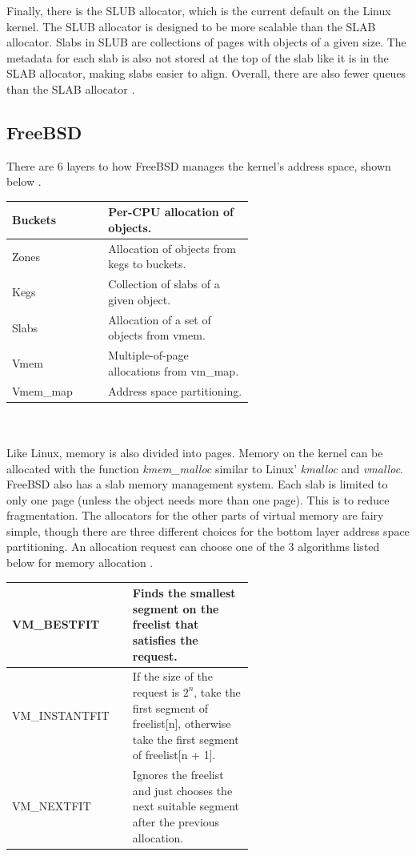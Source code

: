\documentclass[10pt,draftclsnofoot,onecolumn,journal,compsoc]{IEEEtran}
\begin{document}
Finally, there is the SLUB allocator, which is the current default on the Linux kernel. The SLUB allocator is designed to be more scalable than the SLAB allocator. Slabs in SLUB are collections of pages with objects of a given size. The metadata for each slab is also not stored at the top of the slab like it is in the SLAB allocator, making slabs easier to align. Overall, there are also fewer queues than the SLAB allocator \cite{slub}.

\subsection{FreeBSD}
There are 6 layers to how FreeBSD manages the kernel's address space, shown below \cite{bsd_proc}. \\

\begin{tabular}{ | p{0.2\linewidth} | p{0.4\linewidth} |}
    \hline
    Buckets & Per-CPU allocation of objects.\\ \hline
    Zones & Allocation of objects from kegs to buckets.\\ \hline
    Kegs & Collection of slabs of a given object.\\ \hline
    Slabs & Allocation of a set of objects from vmem. \\ \hline
    Vmem & Multiple-of-page allocations from vm\_map.\\ \hline
    Vmem\_map & Address space partitioning. \\ \hline
\end{tabular} \\ \\ 

Like Linux, memory is also divided into pages. Memory on the kernel can be allocated with the function \textit{kmem\_malloc} similar to Linux' \textit{kmalloc} and \textit{vmalloc}. FreeBSD also has a slab memory management system. Each slab is limited to only one page (unless the object needs more than one page). This is to reduce fragmentation. The allocators for the other parts of virtual memory are fairy simple, though there are three different choices for the bottom layer address space partitioning. An allocation request can choose one of the 3 algorithms listed below for memory allocation \cite{bsd_proc}. \\

\begin{tabular}{ | p{0.2\linewidth} | p{0.4\linewidth} |}
    \hline
   VM\_BESTFIT & Finds the smallest segment on the freelist that satisfies the request. \\ \hline
    VM\_INSTANTFIT & If the size of the request is $2^{n}$, take the first segment of freelist[n], otherwise take the first segment of freelist[n + 1].  \\ \hline
    VM\_NEXTFIT & Ignores the freelist and just chooses the next suitable segment after the previous allocation. \\ \hline
\end{tabular} \\ \\ 
\end{document}
